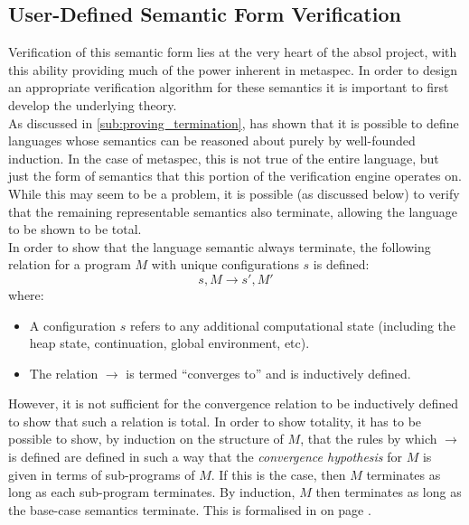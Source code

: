 
\subsection{User-Defined Semantic Form Verification} %
\label{sub:user_defined_semantic_form_verification}
Verification of this semantic form lies at the very heart of the \gls{absol} project, with this ability providing much of the power inherent in \gls{metaspec}.
In order to design an appropriate verification algorithm for these semantics it is important to first develop the underlying theory.\\

As discussed in \autoref{sub:proving_termination}, \citet{nordstrom1988terminating} has shown that it is possible to define languages whose semantics can be reasoned about purely by well-founded induction.
In the case of \gls{metaspec}, this is not true of the entire language, but just the form of semantics that this portion of the verification engine operates on.
While this may seem to be a problem, it is possible (as discussed below) to verify that the remaining representable semantics also terminate, allowing the language to be shown to be total.\\

In order to show that the language semantic always terminate, the following relation for a program $M$ with unique configurations $s$ is defined:
\begin{equation*}
    s, M \to s', M'
    \label{eq:program_convergence}
\end{equation*}
where:
\begin{itemize}
    \item A configuration $s$ refers to any additional computational state (including the heap state, continuation, global environment, etc).
    \item The relation $\to$ is termed ``converges to'' and is inductively defined.
\end{itemize}

However, it is not sufficient for the convergence relation to be inductively defined to show that such a relation is total. 
In order to show totality, it has to be possible to show, by induction on the structure of $M$, that the rules by which $\to$ is defined are defined in such a way that the \textit{convergence hypothesis} for $M$ is given in terms of sub-programs of $M$.
If this is the case, then $M$ terminates as long as each sub-program terminates.
By induction, $M$ then terminates as long as the base-case semantics terminate.
This is formalised in  on page .\\

